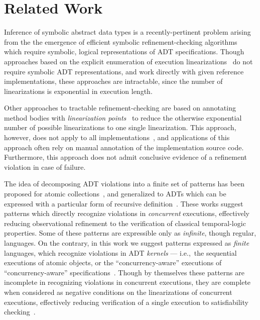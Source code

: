 \section{Related Work}
\label{sec:related}

Inference of symbolic abstract data types is a recently-pertinent problem
arising from the the emergence of efficient symbolic refinement-checking
algorithms~\cite{conf/popl/BouajjaniEEH15, conf/pldi/EmmiEH15} which require
symbolic, logical representations of ADT specifications. Though approaches
based on the explicit enumeration of execution
linearizations~\cite{journals/jpdc/WingG93, conf/pldi/BurckhardtDMT10,
conf/asplos/BurnimNS11, conf/kbse/ZhangCW13} do not require symbolic ADT
representations, and work directly with given reference implementations, these
approaches are intractable, since the number of linearizations is exponential
in execution length.

Other approaches to tractable refinement-checking are based on annotating
method bodies with \emph{linearization
points}~\cite{journals/toplas/HerlihyW90, conf/cav/AmitRRSY07,
conf/fm/LiuCLS09, conf/cav/Vafeiadis10, conf/podc/OHearnRVYY10,
conf/icse/Zhang11a, conf/oopsla/ShachamBASVY11, conf/cav/DragoiGH13,
conf/pldi/LiangF13} to reduce the otherwise exponential number of possible
linearizations to one single linearization. This approach, however, does not
apply to all implementations~\cite{journals/toplas/HerlihyW90}, and
applications of this approach often rely on manual annotation of the
implementation source code. Furthermore, this approach does not admit
conclusive evidence of a refinement violation in case of failure.

The idea of decomposing ADT violations into a finite set of patterns has been
proposed for atomic collections~\cite{conf/tacas/AbdullaHHJR13,
conf/concur/HenzingerSV13, conf/popl/DoddsHK15, conf/popl/BouajjaniEEH15}, and
generalized to ADTs which can be expressed with a particular form of recursive
definition~\cite{journals/arxiv/BouajjaniEEH15}. These works suggest patterns
which directly recognize violations in \emph{concurrent} executions,
effectively reducing observational refinement to the verification of classical
temporal-logic properties. Some of these patterns are expressible only as
\emph{infinite}, though regular, languages. On the contrary, in this work we
suggest patterns expressed as \emph{finite} languages, which recognize
violations in ADT \emph{kernels} — i.e.,~the sequential executions of atomic
objects, or the “concurrency-aware” executions of “concurrency-aware”
specifications~\cite{conf/podc/HemedR14}. Though by themselves these patterns
are incomplete in recognizing violations in concurrent executions, they are
complete when considered as negative conditions on the linearizations of
concurrent executions, effectively reducing verification of a single execution
to satisfiability checking~\cite{conf/pldi/EmmiEH15}.
